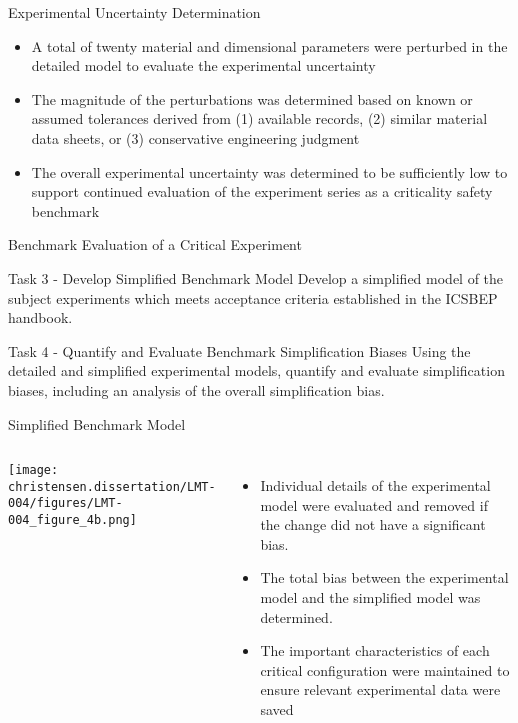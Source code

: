 \documentclass[10pt,aspectratio=169]{beamer}              %
\begin{document}
\begin{frame}{Experimental Uncertainty Determination}
    \begin{itemize}
        \item A total of twenty material and dimensional parameters were perturbed in the detailed model to evaluate the experimental uncertainty
        \item The magnitude of the perturbations was determined based on known or assumed tolerances derived from (1) available records, (2) similar material data sheets, or (3) conservative engineering judgment
        \item The overall experimental uncertainty was determined to be sufficiently low to support continued evaluation of the experiment series as a criticality safety benchmark
    \end{itemize}
\end{frame}

\begin{frame}{Benchmark Evaluation of a Critical Experiment}
    \begin{block}{Task 3 - Develop Simplified Benchmark Model}
         Develop a simplified model of the subject experiments which meets acceptance criteria established in the ICSBEP handbook.
    \end{block}
        
    \begin{block}{Task 4 - Quantify and Evaluate Benchmark Simplification Biases}
        Using the detailed and simplified experimental models, quantify and evaluate simplification biases, including an analysis of the overall simplification bias.
    \end{block}
\end{frame}

\begin{frame}{Simplified Benchmark Model}
    \begin{columns}
            \centering
            \texttt{[image: christensen.dissertation/LMT-004/figures/LMT-004\_figure\_4b.png]}
            \begin{itemize}
                \item Individual details of the experimental model were evaluated and removed if the change did not have a significant bias.
                \item The total bias between the experimental model and the simplified model was determined.
                \item The important characteristics of each critical configuration were maintained to ensure relevant experimental data were saved
            \end{itemize}
    \end{columns}
\end{frame}
\end{document}
